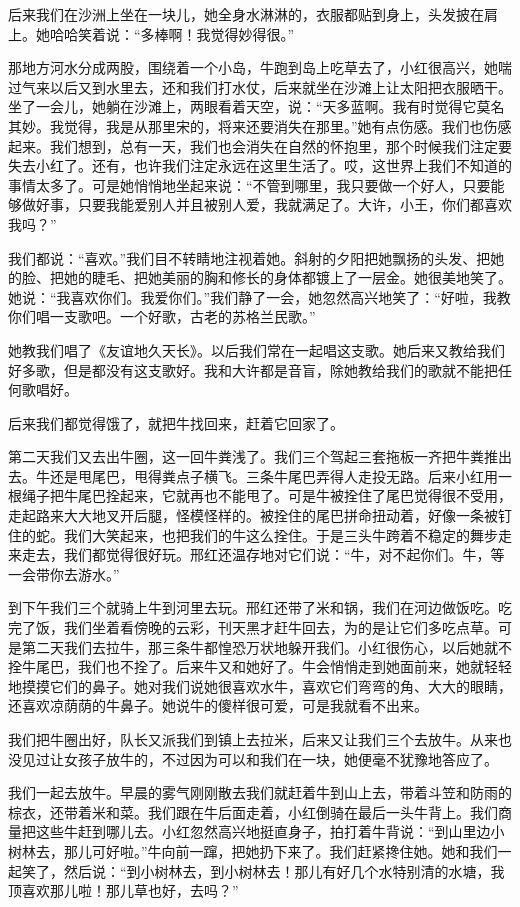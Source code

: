 后来我们在沙洲上坐在一块儿，她全身水淋淋的，衣服都贴到身上，头发披在肩上。她哈哈笑着说：“多棒啊！我觉得妙得很。” 

那地方河水分成两股，围绕着一个小岛，牛跑到岛上吃草去了，小红很高兴，她喘过气来以后又到水里去，还和我们打水仗，后来就坐在沙滩上让太阳把衣服晒干。坐了一会儿，她躺在沙滩上，两眼看着天空，说：“天多蓝啊。我有时觉得它莫名其妙。我觉得，我是从那里宋的，将来还要消失在那里。”她有点伤感。我们也伤感起来。我们想到，总有一天，我们也会消失在自然的怀抱里，那个时候我们注定要失去小红了。还有，也许我们注定永远在这里生活了。哎，这世界上我们不知道的事情太多了。可是她悄悄地坐起来说：“不管到哪里，我只要做一个好人，只要能够做好事，只要我能爱别人并且被别人爱，我就满足了。大许，小王，你们都喜欢我吗？” 

我们都说：“喜欢。”我们目不转睛地注视着她。斜射的夕阳把她飘扬的头发、把她的脸、把她的睫毛、把她美丽的胸和修长的身体都镀上了一层金。她很美地笑了。她说：“我喜欢你们。我爱你们。”我们静了一会，她忽然高兴地笑了：“好啦，我教你们唱一支歌吧。一个好歌，古老的苏格兰民歌。” 

她教我们唱了《友谊地久天长》。以后我们常在一起唱这支歌。她后来又教给我们好多歌，但是都没有这支歌好。我和大许都是音盲，除她教给我们的歌就不能把任何歌唱好。 

后来我们都觉得饿了，就把牛找回来，赶着它回家了。 

第二天我们又去出牛圈，这一回牛粪浅了。我们三个驾起三套拖板一齐把牛粪推出去。牛还是甩尾巴，甩得粪点子横飞。三条牛尾巴弄得人走投无路。后来小红用一根绳子把牛尾巴拴起来，它就再也不能甩了。可是牛被拴住了尾巴觉得很不受用，走起路来大大地叉开后腿，怪模怪样的。被拴住的尾巴拼命扭动着，好像一条被钉住的蛇。我们大笑起来，也把我们的牛这么拴住。于是三头牛跨着不稳定的舞步走来走去，我们都觉得很好玩。邢红还温存地对它们说：“牛，对不起你们。牛，等一会带你去游水。” 

到下午我们三个就骑上牛到河里去玩。邢红还带了米和锅，我们在河边做饭吃。吃完了饭，我们坐着看傍晚的云彩，刊天黑才赶牛回去，为的是让它们多吃点草。可是第二天我们去拉牛，那三条牛都惶恐万状地躲开我们。小红很伤心，以后她就不拴牛尾巴，我们也不拴了。后来牛又和她好了。牛会悄悄走到她面前来，她就轻轻地摸摸它们的鼻子。她对我们说她很喜欢水牛，喜欢它们弯弯的角、大大的眼睛，还喜欢凉荫荫的牛鼻子。她说牛的傻样很可爱，可是我就看不出来。 

我们把牛圈出好，队长又派我们到镇上去拉米，后来又让我们三个去放牛。从来也没见过让女孩子放牛的，不过因为可以和我们在一块，她便毫不犹豫地答应了。 

我们一起去放牛。早晨的雾气刚刚散去我们就赶着牛到山上去，带着斗笠和防雨的棕衣，还带着米和菜。我们跟在牛后面走着，小红倒骑在最后一头牛背上。我们商量把这些牛赶到哪儿去。小红忽然高兴地挺直身子，拍打着牛背说：“到山里边小树林去，那儿可好啦。”牛向前一蹿，把她扔下来了。我们赶紧搀住她。她和我们一起笑了，然后说：“到小树林去，到小树林去！那儿有好几个水特别清的水塘，我顶喜欢那儿啦！那儿草也好，去吗？” 

